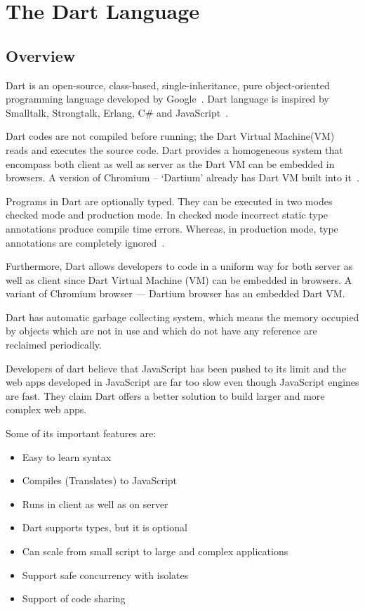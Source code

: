 \section{The Dart Language}
  \subsection{Overview}
  Dart is an open-source, class-based, single-inheritance, pure object-oriented programming language developed by Google~\cite{dartEcma}. Dart language is inspired by Smalltalk, Strongtalk, Erlang, C\# and JavaScript~\cite{sethladd}.

  Dart codes are not compiled before running; the Dart Virtual Machine(VM) reads and executes the source code. Dart provides a homogeneous system that encompass both client as well as server as the Dart VM can be embedded in browsers. A version of Chromium – ‘Dartium’ already has Dart VM built into it~\cite{sethladd}.

  Programs in Dart are optionally typed. They can be executed in two modes checked mode and production mode. In checked mode incorrect static type annotations produce compile time errors. Whereas, in production mode, type annotations are completely ignored~\cite{dartEcma}.

  Furthermore, Dart allows developers to code in a uniform way for both server as well as client since Dart Virtual Machine (VM) can be embedded in browsers. A variant of Chromium browser — Dartium browser has an embedded Dart VM.

  Dart has automatic garbage collecting system, which means the memory occupied by objects which are not in use and which do not have any reference are reclaimed periodically.

  Developers of dart believe that JavaScript has been pushed to its limit and the web apps developed in JavaScript are far too slow even though JavaScript engines are fast. They claim Dart offers a better solution to build larger and more complex web apps\cite{laddWalrath}.

Some of its important features are:
  \begin{itemize}
    \item Easy to learn syntax
    \item Compiles (Translates) to JavaScript
    \item Runs in client as well as on server
    \item Dart supports types, but it is optional
    \item Can scale from small script to large and complex applications
    \item Support safe concurrency with isolates
    \item Support of code sharing
  \end{itemize}

